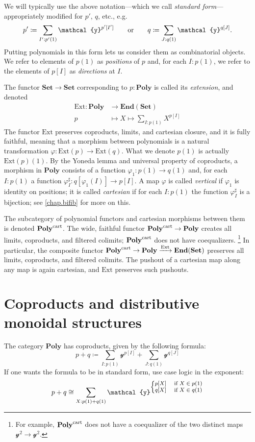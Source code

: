\documentclass[11pt, one side, article]{memoir}
\theoremstyle{definition}
\theoremstyle{plain}
\newcommand{\Cat}[1]{\mathbf{#1}}%
\newcommand{\fun}[1]{\mathrm{#1}}%
\newcommand{\To}[2][]{\xrightarrow[#1]{\tn{$#2$}}}
\newcommand{\tn}[1]{\textnormal{#1}}
\newcommand{\smset}{\Cat{Set}}
\newcommand{\End}{\Cat{End}}
\newcommand{\yon}{{\mathcal{y}}}
\newcommand{\poly}{\Cat{Poly}}
\newcommand{\cart}{\tn{cart}}
\newcommand{\polycart}{\poly^\cart}
\newcommand{\0}{\textsf{0}}
\newcommand{\1}{\tn{\textsf{1}}}
\newcommand{\hh}[2][]{#1 \tn{#2} #1}
\newcommand{\qqor}{\hh[\qquad]{or}}
\newcommand{\ext}{\fun{Ext}}
\begin{document}
We will typically use the above notation---which we call \emph{standard form}---appropriately modified for $p'$, $q$, etc., e.g.
\[
p'\coloneqq\sum_{I': p'(1)}\yon^{p'[I']}
\qqor
q\coloneqq\sum_{J: q(1)}\yon^{q[J]}.
\]
Putting polynomials in this form lets us consider them as combinatorial objects. We refer to elements of $p(1)$ as \emph{positions} of $p$ and, for each $I: p(1)$, we refer to the elements of $p[I]$ as \emph{directions} at $I$.

The functor $\smset\to\smset$ corresponding to $p:\poly$ is called its \emph{extension}, and denoted
\begin{align}
\ext\colon\poly&\to\End(\smset)\label{ext_functor}\\
p&\mapsto X\mapsto\sum_{I:p(1)}X^{p[I]}
\end{align} 
The functor $\ext$ preserves coproducts, limits, and cartesian closure, and it is fully faithful, meaning that a morphism between polynomials is a natural transformation $\varphi\colon \ext(p)\to \ext(q)$. What we denote $p(1)$ is actually $\ext(p)(1)$. By the Yoneda lemma and universal property of coproducts, a morphism in $\poly$ consists of a function $\varphi_1\colon p(1)\to q(1)$ and, for each $I: p(1)$ a function $\varphi^\sharp_I\colon q[\varphi_1(I)]\to p[I]$. A map $\varphi$ is called \emph{vertical} if $\varphi_1$ is identity on positions; it is called \emph{cartesian} if for each $I: p(1)$ the function $\varphi_I^\sharp$ is a bijection; see \cref{chap.bifib} for more on this. 

The subcategory of polynomial functors and cartesian morphisms between them is denoted $\polycart$. The wide, faithful functor $\polycart\to\poly$ creates all limits, coproducts, and filtered colimits; $\polycart$ does not have coequalizers.%
\footnote{For example, $\polycart$ does not have a coequalizer of the two distinct maps $\yon^2\to\yon^2$.} 
In particular, the composite functor $\polycart\to\poly\To{\ext}\End(\smset)$ preserves all limits, coproducts, and filtered colimits. The pushout of a cartesian map along any map is again cartesian, and $\ext$ preserves such pushouts.




\chapter{Coproducts and distributive monoidal structures}

The category $\poly$ has coproducts, given by the following formula:
\begin{equation}
p+q\coloneqq\sum_{I: p(1)}\yon^{p[I]}+\sum_{J: q(1)}\yon^{q[J]}
\end{equation}
If one wants the formula to be in standard form, use case logic in the exponent:
\begin{equation}
p+q\cong\sum_{X: p(1)+q(1)}\yon^{\fontsize{8pt}{8pt}\selectfont
	\begin{cases}
  	p[X]&\tn{ if }X\in p(1)\\
  	q[X]&\tn{ if }X\in q(1)
	\end{cases}\normalsize
	}
\end{equation}
\end{document}
